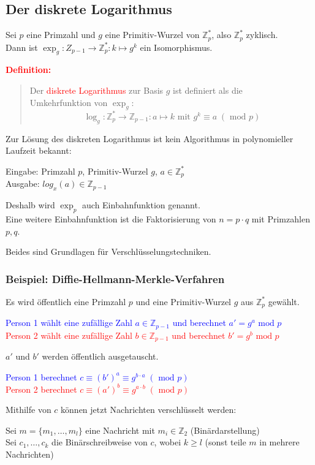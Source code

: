 \documentclass{article}
\newcommand{\red}[1]{\textcolor{red}{#1}}
\newcommand{\blue}[1]{\textcolor{blue}{#1}}
\newcommand{\de}[1]{\red{\textbf{Definition: }}\begin{quote}#1\end{quote}}
\newcommand{\Z}{\mathbb{Z}}
\renewcommand{\mod}{\text{ mod }}
\begin{document}
\subsection{Der diskrete Logarithmus}

Sei $p$ eine Primzahl und $g$ eine Primitiv-Wurzel von $\Z_p^*$, also $\Z_p^*$ zyklisch.\\
Dann ist $\exp_g: Z_{p-1} \to \Z_p^*: k \mapsto g^k$ ein Isomorphismus.

\de{
    Der \red{diskrete Logarithmus} zur Basis $g$ ist definiert als die\\
    Umkehrfunktion von $\exp_g$:
    \[
        \log_g: \Z_p^* \to \Z_{p-1}: a \mapsto k \text{ mit } g^k \equiv a \; (\mod p)   
    \]
}

Zur Lösung des diskreten Logarithmus ist kein Algorithmus in polynomieller Laufzeit bekannt:

Eingabe: Primzahl $p$, Primitiv-Wurzel $g$, $a \in \Z_p^*$\\
Ausgabe: $log_x(a) \in \Z_{p-1}$

Deshalb wird $\exp_p$ auch Einbahnfunktion genannt.\\
Eine weitere Einbahnfunktion ist die Faktorisierung von $n = p \cdot q$ mit Primzahlen $p,q$.

Beides sind Grundlagen für Verschlüsselungstechniken.

\subsubsection{Beispiel: Diffie-Hellmann-Merkle-Verfahren}

Es wird öffentlich eine Primzahl $p$ und eine Primitiv-Wurzel $g$ aus $\Z_p^*$ gewählt.

\blue{Person 1 wählt eine zufällige Zahl $a \in \Z_{p-1}$ und berechnet $a' = g^a \mod p$}\\
\red{Person 2 wählt eine zufällige Zahl $b \in \Z_{p-1}$ und berechnet $b' = g^b \mod p$}

$a'$ und $b'$ werden öffentlich ausgetauscht.

\blue{Person 1 berechnet $c \equiv (b')^a \equiv g^{b \cdot a} \;(\mod p)$}\\
\red{Person 2 berechnet $c \equiv (a')^b \equiv g^{a \cdot b} \;(\mod p)$}

Mithilfe von $c$ können jetzt Nachrichten verschlüsselt werden:

Sei $m = \{m_1, \dots, m_l\}$ eine Nachricht mit $m_i \in \Z_2$ (Binärdarstellung)\\
Sei $c_1,\dots,c_k$ die Binärschreibweise von $c$, wobei $k \geq l$ (sonst teile $m$ in mehrere Nachrichten)
\end{document}
